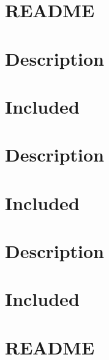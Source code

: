 \documentclass[twoside]{book}
\newcommand{\+}{\discretionary{\mbox{\scriptsize$\hookleftarrow$}}{}{}}
\begin{document}
\chapter{R\+E\+A\+D\+ME}
\label{md_parlai_core_README}

\chapter{Description}
\label{md_parlai_mturk_core_dev_react_server_README}

\chapter{Included}
\label{md_parlai_mturk_core_dev_README}

\chapter{Description}
\label{md_parlai_mturk_core_legacy_2018_react_server_README}

\chapter{Included}
\label{md_parlai_mturk_core_legacy_2018_README}

\chapter{Description}
\label{md_parlai_mturk_core_react_server_README}

\chapter{Included}
\label{md_parlai_mturk_core_README}

\chapter{R\+E\+A\+D\+ME}
\label{md_parlai_mturk_README}

\end{document}
